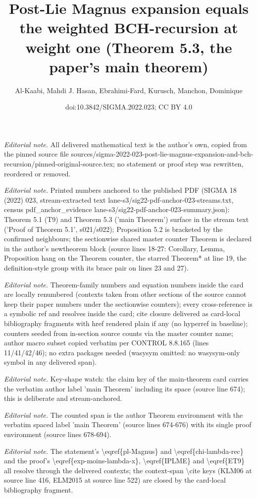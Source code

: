 \documentclass[10pt,a4paper]{article}
\title{Post-Lie Magnus expansion equals the weighted BCH-recursion at weight one (Theorem 5.3, the paper's main theorem)}
\author{Al-Kaabi, Mahdi J. Hasan, Ebrahimi-Fard, Kurusch, Manchon, Dominique}
\date{doi:10.3842/SIGMA.2022.023; CC BY 4.0}
\numberwithin{equation}{section}
\begin{document}
\maketitle
\setcounter{section}{5}
\setcounter{Theorem}{2}
\setcounter{equation}{0}
\noindent\textit{Editorial note.} All delivered mathematical text is the author's own, copied from the pinned source file sources/sigma-2022-023-post-lie-magnus-expansion-and-bch-recursion/pinned-original-source.tex; no statement or proof step was rewritten, reordered or removed.\par\medskip
\noindent\textit{Editorial note.} Printed numbers anchored to the published PDF (SIGMA 18 (2022) 023, stream-extracted text lane-s3/sig22-pdf-anchor-023-streams.txt, census pdf\_anchor\_evidence lane-s3/sig22-pdf-anchor-023-summary.json): Theorem 5.1 (T9) and Theorem 5.3 ('main Theorem') surface in the stream text ('Proof of Theorem 5.1', s021/s022); Proposition 5.2 is bracketed by the confirmed neighbours; the sectionwise shared master counter Theorem is declared in the author's newtheorem block (source lines 18-27: Corollary, Lemma, Proposition hang on the Theorem counter, the starred Theorem* at line 19, the definition-style group with its brace pair on lines 23 and 27).\par\medskip
\noindent\textit{Editorial note.} Theorem-family numbers and equation numbers inside the card are locally renumbered (contexts taken from other sections of the source cannot keep their paper numbers under the sectionwise counters); every cross-reference is a symbolic ref and resolves inside the card; cite closure delivered as card-local bibliography fragments with href rendered plain if any (no hyperref in baseline); counters seeded from in-section source counts via the master counter name; author macro subset copied verbatim per CONTROL 8.8.165 (lines 11/41/42/46); no extra packages needed (wasysym omitted: no wasysym-only symbol in any delivered span).\par\medskip
\noindent\textit{Editorial note.} Key-shape watch: the claim key of the main-theorem card carries the verbatim author label 'main Theorem' including its space (source line 674); this is deliberate and stream-anchored.\par\medskip
\noindent\textit{Editorial note.} The counted span is the author Theorem environment with the verbatim spaced label 'main Theorem' (source lines 674-676) with its single proof environment (source lines 678-694).\par\medskip
\noindent\textit{Editorial note.} The statement's \textbackslash{}eqref\{pl-Magnus\} and \textbackslash{}eqref\{chi-lambda-rec\} and the proof's \textbackslash{}eqref\{exp-moins-lambda-x\}, \textbackslash{}eqref\{IPLME\} and \textbackslash{}eqref\{ET9\} all resolve through the delivered contexts; the context-span \textbackslash{}cite keys (KLM06 at source line 416, ELM2015 at source line 522) are closed by the card-local bibliography fragment.\par\medskip
\end{document}
